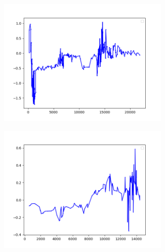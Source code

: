 \documentclass[USenglish,twocolumn]{article}
\begin{document}
\begin{figure}[H]
	\captionsetup[subfigure]{justification=centering}
	\centering
	\begin{subfigure}[b]{0.45\textwidth}
		\centering
		\includegraphics[width=0.9\textwidth]{img/Resoults/DarkTunnel.png}
		\caption{}
		\label{fig:Resoults1}
	\end{subfigure}
	
	\begin{subfigure}[b]{0.45\textwidth}
		\centering
		\includegraphics[width=0.9\textwidth]{img/Resoults/SmallChanges.png}
		\caption{}
		\label{fig:Resoults2}
	\end{subfigure}
	

\end{figure}
\end{document}
